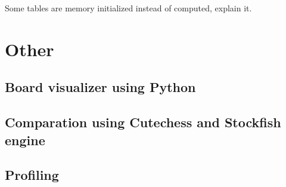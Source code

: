 Some tables are memory initialized instead of computed, explain it.

\section{Other}

\subsection{Board visualizer using Python}

\subsection{Comparation using Cutechess and Stockfish engine}

\subsection{Profiling}